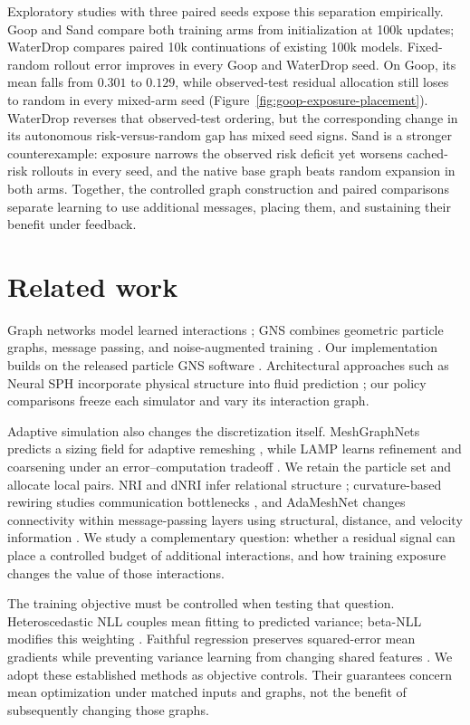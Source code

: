 Exploratory studies with three paired seeds expose this separation empirically. Goop and Sand compare both training arms from initialization at 100k updates; WaterDrop compares paired 10k continuations of existing 100k models. Fixed-random rollout error improves in every Goop and WaterDrop seed. On Goop, its mean falls from $0.301$ to $0.129$, while observed-test residual allocation still loses to random in every mixed-arm seed (Figure~\ref{fig:goop-exposure-placement}). WaterDrop reverses that observed-test ordering, but the corresponding change in its autonomous risk-versus-random gap has mixed seed signs. Sand is a stronger counterexample: exposure narrows the observed risk deficit yet worsens cached-risk rollouts in every seed, and the native base graph beats random expansion in both arms. Together, the controlled graph construction and paired comparisons separate learning to use additional messages, placing them, and sustaining their benefit under feedback.

\section{Related work}
Graph networks model learned interactions \citep{battaglia2016}; GNS combines geometric particle graphs, message passing, and noise-augmented training \citep{sanchez2020}. Our implementation builds on the released particle GNS software \citep{kumar2023}. Architectural approaches such as Neural SPH incorporate physical structure into fluid prediction \citep{toshev2024}; our policy comparisons freeze each simulator and vary its interaction graph.

Adaptive simulation also changes the discretization itself. MeshGraphNets predicts a sizing field for adaptive remeshing \citep{pfaff2021}, while LAMP learns refinement and coarsening under an error--computation tradeoff \citep{wu2023}. We retain the particle set and allocate local pairs. NRI and dNRI infer relational structure \citep{kipf2018,graber2020}; curvature-based rewiring studies communication bottlenecks \citep{topping2022}, and AdaMeshNet changes connectivity within message-passing layers using structural, distance, and velocity information \citep{seo2025}. We study a complementary question: whether a residual signal can place a controlled budget of additional interactions, and how training exposure changes the value of those interactions.

The training objective must be controlled when testing that question. Heteroscedastic NLL couples mean fitting to predicted variance; beta-NLL modifies this weighting \citep{seitzer2022}. Faithful regression preserves squared-error mean gradients while preventing variance learning from changing shared features \citep{stirn2023}. We adopt these established methods as objective controls. Their guarantees concern mean optimization under matched inputs and graphs, not the benefit of subsequently changing those graphs.

